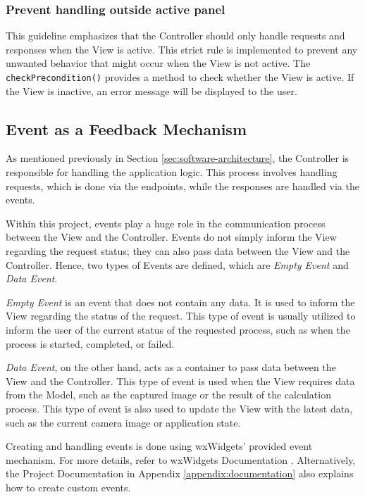 \subsubsection{Prevent handling outside active panel}
\label{subsec:prevent_handling_outside_active_panel}
This guideline emphasizes that the Controller should only handle requests and responses when the View is active. This strict rule is implemented to prevent any unwanted behavior that might occur when the View is not active. The \texttt{checkPrecondition()} provides a method to check whether the View is active. If the View is inactive, an error message will be displayed to the user.

\subsection{Event as a Feedback Mechanism}
\label{subsec:event_as_feedback_mechanism}

As mentioned previously in Section \ref{sec:software-architecture}, the Controller is responsible for handling the application logic. This process involves handling requests, which is done via the endpoints, while the responses are handled via the events.

Within this project, events play a huge role in the communication process between the View and the Controller. Events do not simply inform the View regarding the request status; they can also pass data between the View and the Controller. Hence, two types of Events are defined, which are \textit{Empty Event} and \textit{Data Event}.

\textit{Empty Event} is an event that does not contain any data. It is used to inform the View regarding the status of the request. This type of event is usually utilized to inform the user of the current status of the requested process, such as when the process is started, completed, or failed.

\textit{Data Event}, on the other hand, acts as a container to pass data between the View and the Controller. This type of event is used when the View requires data from the Model, such as the captured image or the result of the calculation process. This type of event is also used to update the View with the latest data, such as the current camera image or application state.

Creating and handling events is done using wxWidgets' provided event mechanism. For more details, refer to wxWidgets Documentation \cite{wxWidgetsEvent}. Alternatively, the Project Documentation in Appendix \ref{appendix:documentation} also explains how to create custom events.

